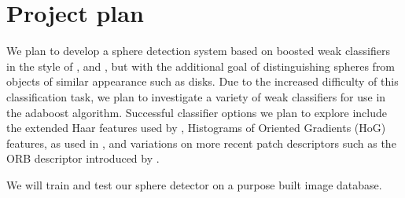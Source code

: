 \documentclass[11pt]{scrartcl}
\begin{document}
	\section{Project plan} {
    \label{sec:plan}



        We plan to develop a sphere detection system based on boosted weak
        classifiers in the style of \citeauthor{zhang2013novel}, and
        \citeauthor{masselli2013haar}, but with the additional goal of
        distinguishing spheres from objects of similar appearance such as
        disks. Due to the increased difficulty of this classification task, we
        plan to investigate a variety of weak classifiers for use in the
        adaboost algorithm. Successful classifier options we plan to explore
        include the extended Haar features used by \citet{zhang2013novel},
        Histograms of Oriented Gradients (HoG) features, as used in
        \citet{zhu2006hogs}, and variations on more recent patch descriptors such
        as the ORB descriptor introduced by \citet{rublee2011orb}.



        We will train and test our sphere detector on a purpose built image database.

}
\end{document}
